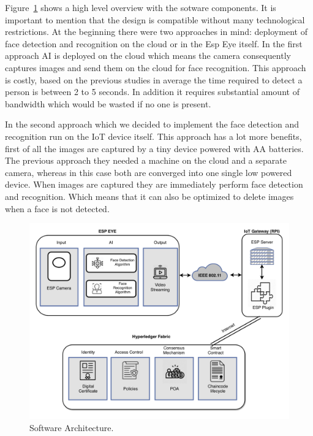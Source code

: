 Figure~\ref{fig:surveillance2} shows a high level overview with the sotware components. It is important to mention that the design is compatible without many technological restrictions. At the beginning there were two approaches in mind: deployment of face detection and recognition on the cloud or in the Esp Eye itself. In the first approach AI is deployed on the cloud which means the camera consequently captures images and send them on the cloud for face recognition. This approach is costly, based on the previous studies in average the time required to detect a person is between 2 to 5 seconds. In addition it requires substantial amount of bandwidth which would be wasted if no one is present.

In the second approach which we decided to implement the face detection and recognition run on the IoT device itself. This approach has a lot more benefits, first of all the images are captured by a tiny device powered with AA batteries. The previous approach they needed a machine on the cloud and a separate camera, whereas in this case both are converged into one single low powered device. When images are captured they are immediately perform face detection and recognition. Which means that it can also be optimized to delete images when a face is not detected. 



\begin{figure}[!htb]
    \centering
    \includegraphics[width=1\textwidth]{figures/esp2.png}
    \caption{Software Architecture.}
    \label{fig:surveillance2}
\end{figure}


